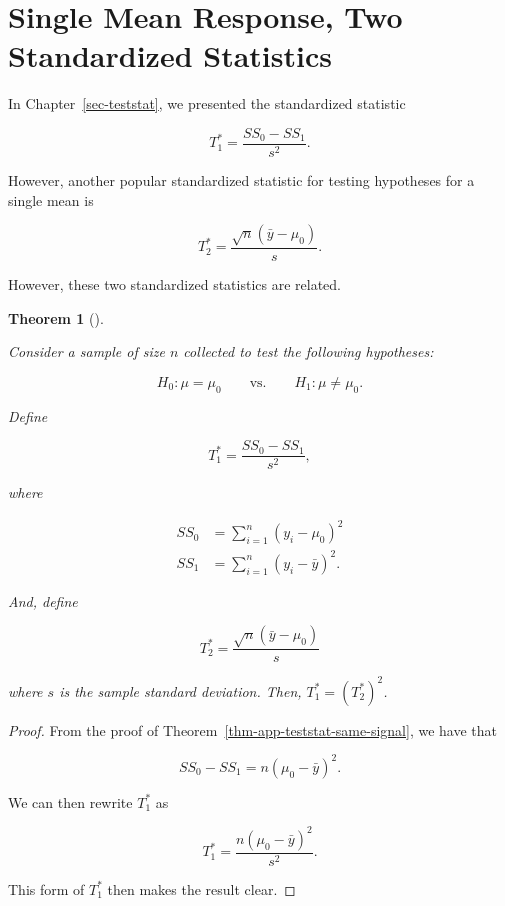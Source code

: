 \documentclass[
  letterpaper,
  DIV=11,
  numbers=noendperiod]{scrreprt}
\theoremstyle{definition}
\theoremstyle{definition}
\theoremstyle{plain}
\newtheorem{theorem}{Theorem}[chapter]
\theoremstyle{remark}
\begin{document}
\section{Single Mean Response, Two Standardized
Statistics}\label{single-mean-response-two-standardized-statistics}

In Chapter~\ref{sec-teststat}, we presented the standardized statistic

\[T_1^* = \frac{SS_0 - SS_1}{s^2}.\]

However, another popular standardized statistic for testing hypotheses
for a single mean is

\[T_2^* = \frac{\sqrt{n} \left(\bar{y} - \mu_0\right)}{s}.\]

However, these two standardized statistics are related.

\begin{theorem}[]\protect\hypertarget{thm-app-teststat-two-statistics}{}\label{thm-app-teststat-two-statistics}

Consider a sample of size \(n\) collected to test the following
hypotheses:

\[H_0: \mu = \mu_0 \qquad \text{vs.} \qquad H_1: \mu \neq \mu_0.\]

Define

\[T_1^* = \frac{SS_0 - SS_1}{s^2},\]

where

\[
\begin{aligned}
  SS_0 &= \sum_{i=1}^{n} \left(y_i - \mu_0\right)^2 \\
  SS_1 &= \sum_{i=1}^{n} \left(y_i - \bar{y}\right)^2.
\end{aligned}
\]

And, define

\[T_2^* = \frac{\sqrt{n} \left(\bar{y} - \mu_0\right)}{s}\]

where \(s\) is the sample standard deviation. Then,
\(T_1^* = \left(T_2^*\right)^2\).

\end{theorem}

\begin{proof}
From the proof of Theorem~\ref{thm-app-teststat-same-signal}, we have
that

\[SS_0 - SS_1 = n \left(\mu_0 - \bar{y}\right)^2.\]

We can then rewrite \(T_1^*\) as

\[T_1^* = \frac{n\left(\mu_0 - \bar{y}\right)^2}{s^2}.\]

This form of \(T_1^*\) then makes the result clear.
\end{proof}
\end{document}
